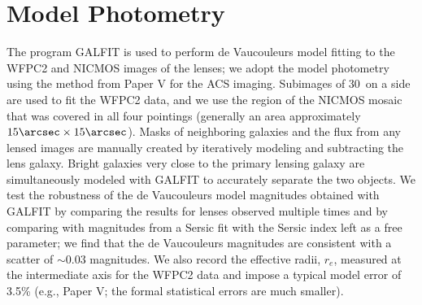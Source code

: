 \documentclass[iop]{emulateapj}
\begin{document}
%



\section{Model Photometry}
The program GALFIT \citep{galfit} is used to perform de Vaucouleurs model fitting to the WFPC2 and NICMOS images of the lenses; we adopt the model photometry using the method from Paper V for the ACS imaging. Subimages of 30\arcsec\ on a side are used to fit the WFPC2 data, and we use the region of the NICMOS mosaic that was covered in all four pointings (generally an area approximately $15\arcsec\times15\arcsec$). Masks of neighboring galaxies and the flux from any lensed images are manually created by iteratively modeling and subtracting the lens galaxy. Bright galaxies very close to the primary lensing galaxy are simultaneously modeled with GALFIT to accurately separate the two objects. We test the robustness of the de Vaucouleurs model magnitudes obtained with GALFIT by comparing the results for lenses observed multiple times and by comparing with magnitudes from a Sersic fit with the Sersic index left as a free parameter; we find that the de Vaucouleurs magnitudes are consistent with a scatter of $\sim0.03$ magnitudes. We also record the effective radii, $r_e$, measured at the intermediate axis for the WFPC2 data and impose a typical model error of 3.5\% (e.g., Paper V; the formal statistical errors are much smaller).
\end{document}
